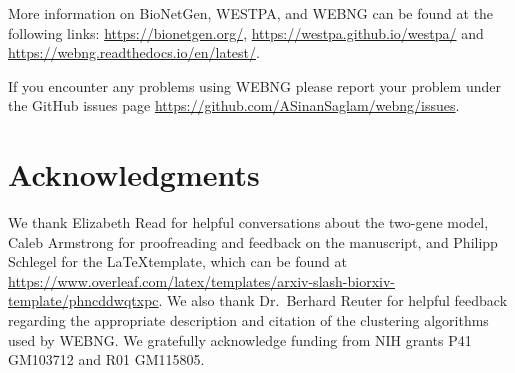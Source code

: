 \documentclass[10pt,letterpaper]{article}
\begin{document}
More information on BioNetGen, WESTPA, and WEBNG can be found at the following links: \url{https://bionetgen.org/}, \url{https://westpa.github.io/westpa/}
and \url{https://webng.readthedocs.io/en/latest/}.

If you encounter any problems using WEBNG please report your problem under the GitHub issues page \url{https://github.com/ASinanSaglam/webng/issues}.

\section*{Acknowledgments}
We thank Elizabeth Read for helpful conversations about the two-gene model, Caleb Armstrong for proofreading and feedback on the manuscript, and Philipp Schlegel for the \LaTeX template, which can be found at \url{https://www.overleaf.com/latex/templates/arxiv-slash-biorxiv-template/phncddwqtxpc}. We also thank Dr.\ Berhard Reuter for helpful feedback regarding the appropriate description and citation of the clustering algorithms used by WEBNG. We gratefully acknowledge funding from NIH grants P41 GM103712 and R01 GM115805.

\nolinenumbers




\end{document}
